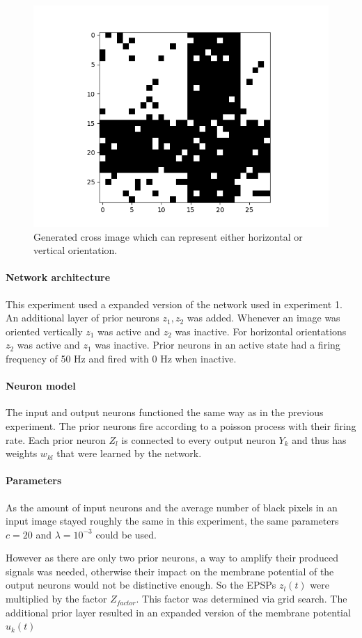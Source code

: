 \begin{figure}
  \includegraphics[width=0.6\linewidth]{figures/horvert/horvertTrainingCrossImage.png}
  \caption{Generated cross image which can represent either horizontal or vertical orientation.}
  \label{fig:horvertTrainingCrossImage}
\end{figure}


\paragraph{Network architecture}

This experiment used a expanded version of the network used in experiment 1. An additional layer of prior neurons $z_1,z_2$ was added. Whenever an image was oriented vertically $z_1$ was active and $z_2$ was inactive. For horizontal orientations $z_2$ was active and $z_1$ was inactive. Prior neurons in an active state had a firing frequency of 50 Hz and fired with 0 Hz when inactive.

\paragraph{Neuron model}
The input and output neurons functioned the same way as in the previous experiment. The prior neurons fire according to a poisson process with their firing rate. Each prior neuron $Z_l$ is connected to every output neuron $Y_k$ and thus has weights $w_{kl}$ that were learned by the network. 

\paragraph{Parameters}
As the amount of input neurons and the average number of black pixels in an input image stayed roughly the same in this experiment, the same parameters $c=  20$ and $\lambda = 10^{-3}$ could be used.

 However as there are only two prior neurons, a way to amplify their produced signals was needed, otherwise their impact on the membrane potential of the output neurons would not be distinctive enough. So the EPSPs $z_l(t)$ were multiplied by the factor $Z_{factor}$. This factor was determined via grid search. The additional prior layer resulted in an expanded version of the membrane potential $u_k(t)$

